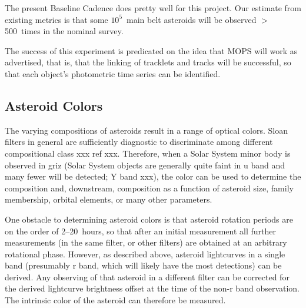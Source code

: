 The present Baseline Cadence does pretty well for this project. Our
estimate from existing metrics is that some $10^5$~main belt asteroids
will be observed $>$500~times in the nominal survey.


%

The success of this experiment is predicated on the idea that MOPS will
work as advertised, that is, that the linking of tracklets and tracks
will be successful, so that each object's photometric time series can be
identified.

%
%

\subsection{Asteroid Colors}

The varying compositions of asteroids result in a range of optical
colors. Sloan filters in general are sufficiently diagnostic to
discriminate among different compositional class xxx ref xxx. Therefore,
when a Solar System minor body is observed in griz (Solar System objects
are generally quite faint in u band and many fewer will be detected; Y
band xxx), the color can be used to determine the composition and,
downstream, composition as a function of asteroid size, family
membership, orbital elements, or many other parameters.

One obstacle to determining asteroid colors is that asteroid rotation
periods are on the order of 2--20~hours, so that after an initial
measurement all further measurements (in the same filter, or other
filters) are obtained at an arbitrary rotational phase. However, as
described above, asteroid lightcurves in a single band (presumably r
band, which will likely have the most detections) can be derived. Any
observing of that asteroid in a different filter can be corrected for
the derived lightcurve brightness offset at the time of the non-r band
observation. The intrinsic color of the asteroid can therefore be
measured.

